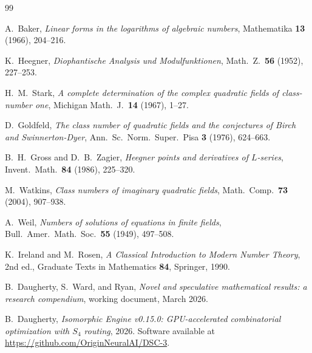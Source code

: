 \documentclass[11pt]{amsart}
\theoremstyle{definition}
\begin{document}
\begin{thebibliography}{99}

A.~Baker, \emph{Linear forms in the logarithms of algebraic numbers}, Mathematika \textbf{13} (1966), 204--216.

K.~Heegner, \emph{Diophantische Analysis und Modulfunktionen}, Math.\ Z.\ \textbf{56} (1952), 227--253.

H.~M.~Stark, \emph{A complete determination of the complex quadratic fields of class-number one}, Michigan Math.\ J.\ \textbf{14} (1967), 1--27.

D.~Goldfeld, \emph{The class number of quadratic fields and the conjectures of Birch and Swinnerton-Dyer}, Ann.\ Sc.\ Norm.\ Super.\ Pisa \textbf{3} (1976), 624--663.

B.~H.~Gross and D.~B.~Zagier, \emph{Heegner points and derivatives of $L$-series}, Invent.\ Math.\ \textbf{84} (1986), 225--320.

M.~Watkins, \emph{Class numbers of imaginary quadratic fields}, Math.\ Comp.\ \textbf{73} (2004), 907--938.

A.~Weil, \emph{Numbers of solutions of equations in finite fields}, Bull.\ Amer.\ Math.\ Soc.\ \textbf{55} (1949), 497--508.

K.~Ireland and M.~Rosen, \emph{A Classical Introduction to Modern Number Theory}, 2nd ed., Graduate Texts in Mathematics \textbf{84}, Springer, 1990.

B.~Daugherty, S.~Ward, and Ryan, \emph{Novel and speculative mathematical results: a research compendium}, working document, March 2026.

B.~Daugherty, \emph{Isomorphic Engine v0.15.0: GPU-accelerated combinatorial optimization with $S_4$ routing}, 2026. Software available at \url{https://github.com/OriginNeuralAI/DSC-3}.

\end{thebibliography}
\end{document}
